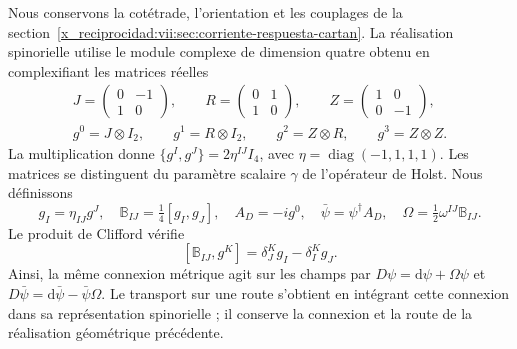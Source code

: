 Nous conservons la cotétrade, l'orientation et les couplages de la
section~\ref{x_reciprocidad:vii:sec:corriente-respuesta-cartan}. La réalisation
spinorielle utilise le module complexe de dimension quatre obtenu en
complexifiant les matrices réelles
\begin{equation}
 \begin{gathered}
 J=\begin{pmatrix}0&-1\\1&0\end{pmatrix},\qquad
 R=\begin{pmatrix}0&1\\1&0\end{pmatrix},\qquad
 Z=\begin{pmatrix}1&0\\0&-1\end{pmatrix},\\
 g^0=J\otimes I_2,\qquad g^1=R\otimes I_2,\qquad
 g^2=Z\otimes R,\qquad g^3=Z\otimes Z.
 \end{gathered}
 \label{x_reciprocidad:vii:eq:clifford-material-explicito}
\end{equation}
La multiplication donne
\(\{g^I,g^J\}=2\eta^{IJ}I_4\), avec
\(\eta=\operatorname{diag}(-1,1,1,1)\). Les matrices se distinguent
du paramètre scalaire \(\gamma\) de l'opérateur de Holst. Nous définissons
\begin{equation}
 g_I=\eta_{IJ}g^J,\quad
 \mathbb B_{IJ}=\tfrac14[g_I,g_J],\quad
 A_D=-i g^0,\quad \bar\psi=\psi^\dagger A_D,\quad
 \Omega=\tfrac12\omega^{IJ}\mathbb B_{IJ}.
 \label{x_reciprocidad:vii:eq:adjunto-conexion-espinorial}
\end{equation}
Le produit de Clifford vérifie
\[
 [\mathbb B_{IJ},g^K]=\delta_J^K g_I-\delta_I^K g_J.
\]
Ainsi, la même connexion métrique agit sur les champs par
\(D\psi=\mathrm d\psi+\Omega\psi\) et
\(D\bar\psi=\mathrm d\bar\psi-\bar\psi\Omega\).
Le transport sur une route s'obtient en intégrant cette connexion dans
sa représentation spinorielle ; il conserve la connexion et la route de la
réalisation géométrique précédente.

